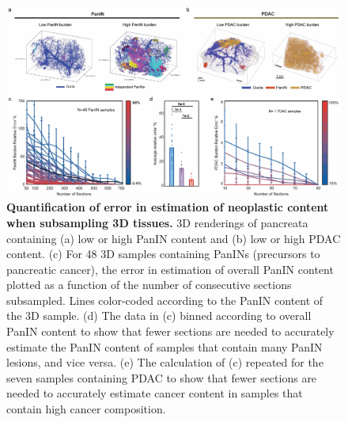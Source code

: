 \begin{refsection}
    \begin{figure}[h!]
        \begin{center}
            \includegraphics[width=\textwidth,clip,page=1] {figures/chapter2/PDAC_Fig_5.jpg}
            \caption{\textbf{Quantification of error in estimation of neoplastic content when subsampling 3D tissues.} 3D renderings of pancreata containing (a) low or high PanIN content and (b) low or high PDAC content. (c) For 48 3D samples containing PanINs (precursors to pancreatic cancer), the error in estimation of overall PanIN content plotted as a function of the number of consecutive sections subsampled. Lines color-coded according to the PanIN content of the 3D sample. (d) The data in (c) binned according to overall PanIN content to show that fewer sections are needed to accurately estimate the PanIN content of samples that contain many PanIN lesions, and vice versa. (e) The calculation of (c) repeated for the seven samples containing PDAC to show that fewer sections are needed to accurately estimate cancer content in samples that contain high cancer composition.}
            \label{chapter2_fig5}
        \end{center}
    \end{figure}

    
    

\end{refsection}
